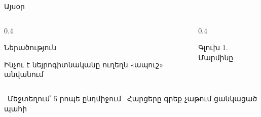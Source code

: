 \begin{frame}{Այսօր}
  \begin{columns}[T]
    \begin{column}{0.4\textwidth}
      \begin{card}[colback=butter!45!cream]
        {\blackfont Ներածություն}\par\smallskip
        Ինչու է նեյրոգիտնականը ուղեղն «ապուշ» անվանում
      \end{card}
    \end{column}
    \begin{column}{0.4\textwidth}
      \begin{card}[colback=mint!45!cream]
        {\blackfont Գլուխ 1. Մարմինը}\par\smallskip
        \par\smallskip
        \par\smallskip
        \par\smallskip
      \end{card}
    \end{column}
  \end{columns}
  \vspace{1mm}
  \centering
  {\small {}\ Մեջտեղում՝ 5 րոպե ընդմիջում \quad {}\ Հարցերը գրեք չաթում ցանկացած պահի}
\end{frame}
